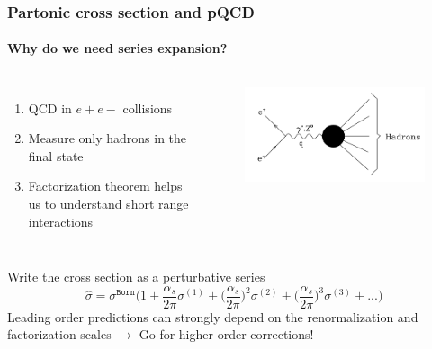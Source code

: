 \documentclass[aspectratio=43]{beamer}
\begin{document}
\begin{frame}

	\frametitle{Partonic cross section and pQCD}
	\framesubtitle{Why do we need series expansion?}
	\begin{columns}
		
		
		\begin{enumerate}
			\item QCD in $e+e-$ collisions
			\item Measure only hadrons in the final state
			\item Factorization theorem helps us to understand short range interactions
		\end{enumerate}
		
		\begin{figure}[!htb]
			\includegraphics[width = \linewidth]{plots/ee_hadrons.png}
		\end{figure}
	
	\end{columns}
	
	\vspace{1cm}
	
	Write the cross section as a perturbative series
	\begin{equation}
		\hat{\sigma} = \sigma^{\texttt{Born}} \Bigg( 1 +
		\frac{\alpha_{s}}{2\pi} \sigma^{(1)} + 
		\Big(\frac{\alpha_{s}}{2\pi}\Big)^{2} \sigma^{(2)} + 
		\Big(\frac{\alpha_{s}}{2\pi}\Big)^{3} \sigma^{(3)} + ... \Bigg) \nonumber
	\end{equation}
	Leading order predictions can strongly depend on the renormalization and factorization scales $\rightarrow$ {\color{red}Go for higher order corrections!}
\end{frame}
\end{document}
